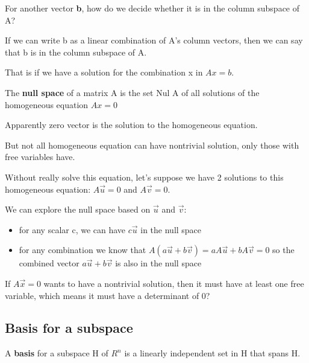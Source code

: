For another vector \textbf{b}, how do we decide whether it is in the column subspace of A? 

If we can write b as a linear combination of A's column vectors, then we can say that b is in the column subspace of A.

That is if we have a solution for the combination x in \(A x = b\).

\begin{definition}
    The \textbf{null space} of a matrix A is the set Nul A of all solutions of the homogeneous equation \(Ax = 0\) 
\end{definition}

\begin{remark}
    Apparently zero vector is the solution to the homogeneous equation.
\end{remark}

\begin{remark}
    But not all homogeneous equation can have nontrivial solution, only those with free variables have. 
\end{remark}

Without really solve this equation, let's suppose we have 2 solutions to this homogeneous equation: \(A \vec{u}  = 0\) and \(A \vec{v}  = 0\).  

We can explore the null space based on \(\vec{u} \) and \(\vec{v} \):
\begin{itemize}
    \item for any scalar c, we can have \(c \vec{u} \) in the null space 
    \item for any combination we know that \(A(a\vec{u}  + b\vec{v} ) = aA \vec{u}  + bA \vec{v} = 0\) so the combined vector  \(a \vec{u}  + b \vec{v} \) is also in the null space 
\end{itemize}
        
\begin{remark}
    If \(A \vec{x}  = 0\) wants to have a nontrivial solution, then it must have at least one free variable, which means it must have a determinant of 0?  
\end{remark}


\subsection{Basis for a subspace}

\begin{definition}
    A \textbf{basis} for a subspace H of \(R^n\) is a linearly independent set in H that spans H.  
\end{definition}

